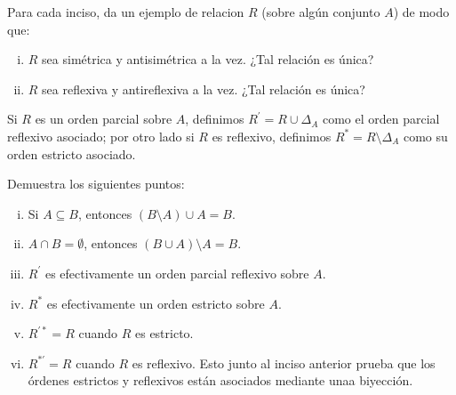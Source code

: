 \begin{exercise}[parzfc=2]
  Para cada inciso, da un ejemplo de relacion $R$ (sobre algún conjunto $A$) de modo que:
  \begin{enumerate}[i)]
    \item $R$ sea simétrica y antisimétrica a la vez. ¿Tal relación es única?
    \item $R$ sea reflexiva y antireflexiva a la vez. ¿Tal relación es única?
  \end{enumerate}
\end{exercise}

\begin{exercise}[parzfc=2, tezfc=2]
  Si $R$ es un orden parcial sobre $A$, definimos $R^\prime=R\cup \Delta_A$ como el orden parcial reflexivo asociado; por otro lado si $R$ es reflexivo, definimos $R^*=R\setminus \Delta_A$ como su orden estricto asociado.

  Demuestra los siguientes puntos:
  \begin{enumerate}[i)]
      \item Si $A\subseteq B$, entonces $(B\setminus A)\cup A=B$.
      \item $A\cap B=\emptyset$, entonces $(B\cup A)\setminus A=B$.
      \item $R^\prime$ es efectivamente un orden parcial reflexivo sobre $A$.
      \item $R^*$ es efectivamente un orden estricto sobre $A$.
      \item $R^{\prime*}=R$ cuando $R$ es estricto.
      \item $R^{*\prime}=R$ cuando $R$ es reflexivo. Esto junto al inciso anterior prueba que los órdenes estrictos y reflexivos están asociados mediante unaa biyección.
  \end{enumerate}
\end{exercise}


